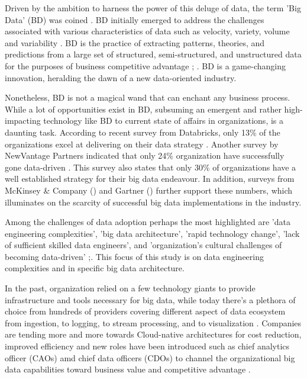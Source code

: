 \documentclass[review]{elsarticle}
\begin{document}
Driven by the ambition to harness the power of this deluge of data, the term 'Big Data' (BD) was coined \cite{lycett2013datafication}. BD initially emerged to address the challenges associated with various characteristics of data such as velocity, variety, volume and variability \cite{AtaeiBigDataEnvirons}. BD is the practice of extracting patterns, theories, and predictions from a large set of structured, semi-structured, and unstructured data for the purposes of business competitive advantage \cite{AtaeiHype}; \cite{Huberty}. BD is a game-changing innovation, heralding the dawn of a new data-oriented industry. 

Nonetheless, BD is not a magical wand that can enchant any business process. While a lot of opportunities exist in BD, subsuming an emergent and rather high-impacting technology like BD to current state of affairs in organizations, is a daunting task. According to recent survey from Databricks, only 13\% of the organizations excel at delivering on their data strategy \cite{DataBricksSurvey}. Another survey by NewVantage Partners indicated that only 24\% organization have successfully gone data-driven \cite{NewVantageSurvey}. This survey also states that only 30\% of organizations have a well established strategy for their big data endeavour. In addition, surveys from McKinsey \& Company (\cite{analytics2016age}) and Gartner (\cite{Nash}) further support these numbers, which illuminates on the scarcity of successful big data implementations in the industry.

Among the challenges of data adoption perhaps the most highlighted are 'data engineering complexities', 'big data architecture', 'rapid technology change', 'lack of sufficient skilled data engineers', and 'organization's cultural challenges of becoming data-driven' \cite{AtaeiBigDataEnvirons};\cite{Singh}. This focus of this study is on data engineering complexities and in specific big data architecture.

In the past, organization relied on a few technology giants to provide infrastructure and tools necessary for big data, while today there's a plethora of choice from hundreds of providers covering different aspect of data ecosystem from ingestion, to logging, to stream processing, and to visualization \cite{NewVantageSurvey}. Companies are tending more and more towards Cloud-native architectures for cost reduction, improved efficiency and new roles have been introduced such as chief analytics officer (CAOs) amd chief data officers (CDOs) to channel the organizational big data capabilities toward business value and competitive advantage \cite{rad2017evaluating}. 
\end{document}
